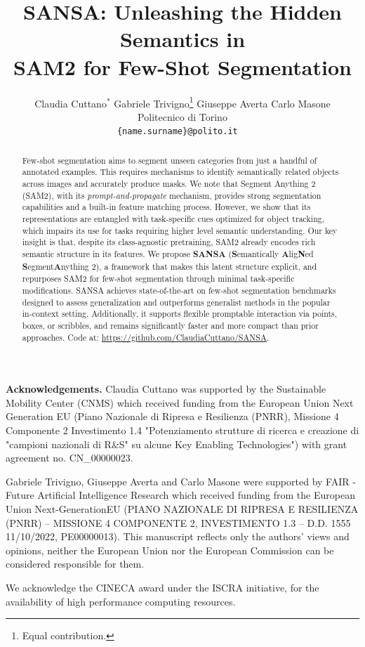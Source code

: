 \documentclass{article}
\title{SANSA: Unleashing the Hidden Semantics in \\ SAM2 for Few-Shot Segmentation}
\author{Claudia Cuttano${^{*} }$ \quad Gabriele Trivigno\thanks{Equal contribution.}
\quad
Giuseppe Averta
\quad
Carlo Masone  \\[0.2cm]
Politecnico di Torino \\
{\tt\small \{name.surname\}@polito.it \
}
}
\newcommand{\myparagraph}[1]{\vspace{4pt}\noindent\textbf{#1.}}
\newcommand\ours{SANSA}
\begin{document}
\maketitle


\begin{abstract}
Few-shot segmentation aims to segment unseen categories from just a handful of annotated examples. This requires mechanisms to identify semantically related objects across images and accurately produce masks. We note that Segment Anything 2 (SAM2), with its \textit{prompt-and-propagate} mechanism, provides strong segmentation capabilities and a built-in feature matching process. However, we show that its representations are entangled with task-specific cues optimized for object tracking, which impairs its use for tasks requiring higher level semantic understanding. Our key insight is that, despite its class-agnostic pretraining, SAM2 already encodes rich semantic structure in its features. We propose \textbf{\ours{}} (\textbf{S}emantically \textbf{A}lig\textbf{N}ed \textbf{S}egment\textbf{A}nything 2), a framework that makes this latent structure explicit, and repurposes SAM2 for few-shot segmentation through minimal task-specific modifications. SANSA achieves state-of-the-art on few-shot segmentation benchmarks designed to assess generalization and outperforms generalist methods in the popular in-context setting. Additionally, it supports  flexible promptable interaction via points, boxes, or scribbles, and remains significantly faster and more compact than prior approaches.  Code at: \url{https://github.com/ClaudiaCuttano/SANSA}.
\end{abstract}








\myparagraph{Acknowledgements}
Claudia Cuttano was supported by the Sustainable Mobility Center (CNMS) which received funding from the European Union Next Generation EU (Piano Nazionale di Ripresa e Resilienza (PNRR), Missione 4 Componente 2 Investimento 1.4 "Potenziamento strutture di ricerca e creazione di "campioni nazionali di R\&S" su alcune Key Enabling Technologies") with grant agreement no. CN\_00000023. 

Gabriele Trivigno, Giuseppe Averta and Carlo Masone were supported by FAIR - Future Artificial Intelligence Research which received funding from the European Union Next-GenerationEU (PIANO NAZIONALE DI RIPRESA E RESILIENZA (PNRR) – MISSIONE 4 COMPONENTE 2, INVESTIMENTO 1.3 – D.D. 1555 11/10/2022, PE00000013).  This manuscript reflects only the authors’ views and opinions, neither the European Union nor the European Commission can be considered responsible for them.

We acknowledge the CINECA award
under the ISCRA initiative, for the availability of high performance computing resources.

%
{
    \small
    
    
}

\newpage



\newpage
\end{document}
